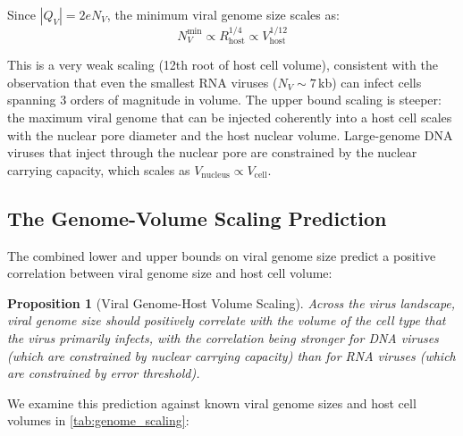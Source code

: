 \documentclass[12pt,a4paper]{article}
\newtheorem{proposition}[theorem]{Proposition}
\theoremstyle{definition}
\theoremstyle{remark}
\newcommand{\abs}[1]{\left|#1\right|}
\begin{document}
Since $\abs{Q_V} = 2e N_V$, the minimum viral genome size scales as:
\begin{equation}
  N_V^{\mathrm{min}} \propto R_{\mathrm{host}}^{1/4} \propto V_{\mathrm{host}}^{1/12}
\end{equation}

This is a very weak scaling (12th root of host cell volume), consistent with the observation that even the smallest RNA viruses ($N_V \sim 7$\,kb) can infect cells spanning 3 orders of magnitude in volume. The upper bound scaling is steeper: the maximum viral genome that can be injected coherently into a host cell scales with the nuclear pore diameter and the host nuclear volume. Large-genome DNA viruses that inject through the nuclear pore are constrained by the nuclear carrying capacity, which scales as $V_{\mathrm{nucleus}} \propto V_{\mathrm{cell}}$.

\subsection{The Genome-Volume Scaling Prediction}

The combined lower and upper bounds on viral genome size predict a positive correlation between viral genome size and host cell volume:

\begin{proposition}[Viral Genome-Host Volume Scaling]
\label{prop:genome_volume}
Across the virus landscape, viral genome size should positively correlate with the volume of the cell type that the virus primarily infects, with the correlation being stronger for DNA viruses (which are constrained by nuclear carrying capacity) than for RNA viruses (which are constrained by error threshold).
\end{proposition}

We examine this prediction against known viral genome sizes and host cell volumes in \cref{tab:genome_scaling}:
\end{document}
